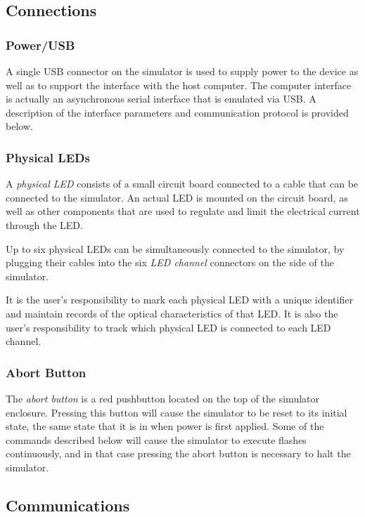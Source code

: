 \documentclass[letterpaper,11pt]{article}
\begin{document}
\subsection*{Connections}
\subsubsection*{Power/USB}

A single USB connector on the simulator is used to supply power to the device
as well as to support the interface with the host computer. The computer
interface is actually an asynchronous serial interface that is emulated via
USB. A description of the interface parameters and communication protocol is
provided below.

\subsubsection*{Physical LEDs}

A \textit{physical LED} consists of a small circuit board connected to a cable
that can be connected to the simulator. An actual LED is mounted on the circuit
board, as well as other components that are used to regulate and limit the
electrical current through the LED.

Up to six physical LEDs can be simultaneously connected to the simulator, by
plugging their cables into the six \textit{LED channel} connectors on the side
of the simulator.

It is the user's responsibility to mark each physical LED with a unique
identifier and maintain records of the optical characteristics of that LED.
It is also the user's responsibility to track which physical LED is connected
to each LED channel.

\subsubsection*{Abort Button}

The \textit{abort button} is a red pushbutton located on the top of the
simulator enclosure. Pressing this button will cause the simulator to be reset
to its initial state, the same state that it is in when power is first applied.
Some of the commands described below will cause the simulator to execute
flashes continuously, and in that case pressing the abort button is necessary
to halt the simulator. 

\subsection*{Communications}
\end{document}
